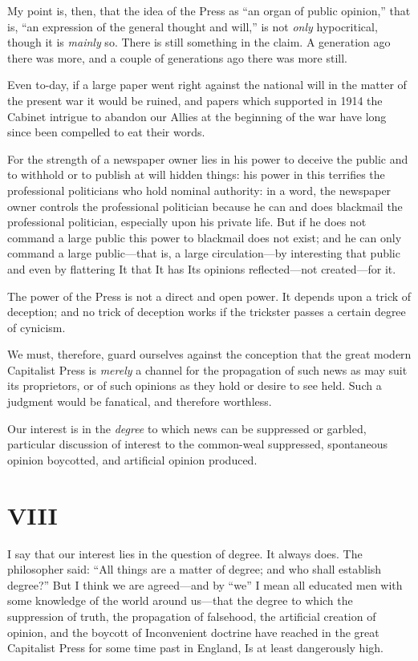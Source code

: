 \documentclass{book}
\begin{document}
My point is, then, that the idea of the Press as “an organ of public opinion,” that is, “an expression of the general thought and will,” is not \emph{only} hypocritical, though it is \emph{mainly} so. There is still something in the claim. A generation ago there was more, and a couple of generations ago there was more still.

Even to-day, if a large paper went right against the national will in the matter of the present war it would be ruined, and papers which supported in 1914 the Cabinet intrigue to abandon our Allies at the beginning of the war have long since been compelled to eat their words.

For the strength of a newspaper owner lies in his power to deceive the public and to withhold or to publish at will hidden things: his power in this terrifies the professional politicians who hold nominal authority: in a word, the newspaper owner controls the professional politician because he can and does blackmail the professional politician, especially upon his private life. But if he does not command a large public this power to blackmail does not exist; and he can only command a large public—that is, a large circulation—by interesting that public and even by flattering It that It has Its opinions reflected—not created—for it.

The power of the Press is not a direct and open power. It depends upon a trick of deception; and no trick of deception works if the trickster passes a certain degree of cynicism.

We must, therefore, guard ourselves against the conception that the great modern Capitalist Press is \emph{merely} a channel for the propagation of such news as may suit its proprietors, or of such opinions as they hold or desire to see held. Such a judgment would be fanatical, and therefore worthless.

Our interest is in the \emph{degree} to which news can be suppressed or garbled, particular discussion of interest to the common-weal suppressed, spontaneous opinion boycotted, and artificial opinion produced.

\chapter*{VIII}
\label{chapter-9}
I say that our interest lies in the question of degree. It always does. The philosopher said: “All things are a matter of degree; and who shall establish degree?” But I think we are agreed—and by “we” I mean all educated men with some knowledge of the world around us—that the degree to which the suppression of truth, the propagation of falsehood, the artificial creation of opinion, and the boycott of Inconvenient doctrine have reached in the great Capitalist Press for some time past in England, Is at least dangerously high.
\end{document}
